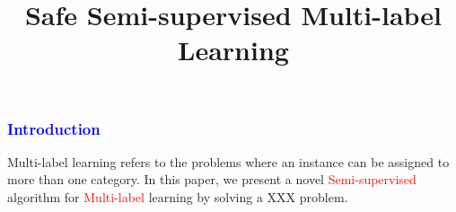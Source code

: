 \documentclass{beamer}
\title{Safe Semi-supervised Multi-label Learning}
\date{

 \hfill {Tong Wei}
~\\
\hfill{Oct. 10$^{\text{th}}$, 2016}
}
\begin{document}


\begin{frame}
\titlepage
\end{frame}

\begin{frame}
\frametitle{ \textcolor{blue}{Introduction}}
Multi-label learning refers to the problems where an
instance can be assigned to more than one category.
In this paper, we present a novel \textcolor{red}{Semi-supervised} algorithm
for \textcolor{red}{Multi-label} learning by solving a XXX problem.
\end{frame}


\end{document}
